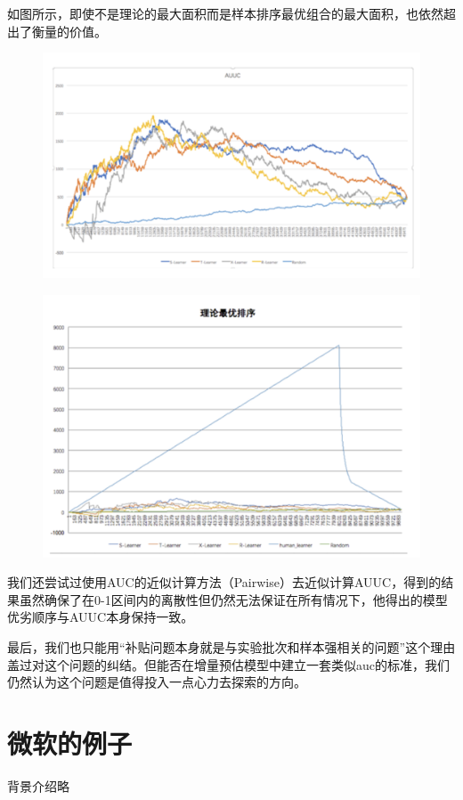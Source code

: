 \documentclass[12pt]{article}
\begin{document}
如图所示，即使不是理论的最大面积而是样本排序最优组合的最大面积，也依然超出了衡量的价值。
\begin{figure}[H]
    \centering
    \includegraphics[width=.8\textwidth]{fig/Casual_Inference_In_Didi_23.png}
\end{figure}
\begin{figure}[H]
    \centering
    \includegraphics[width=.8\textwidth]{fig/Casual_Inference_In_Didi_24.png}
\end{figure}
我们还尝试过使用AUC的近似计算方法（Pairwise）去近似计算AUUC，得到的结果虽然确保了在0-1区间内的离散性但仍然无法保证在所有情况下，他得出的模型优劣顺序与AUUC本身保持一致。

最后，我们也只能用“补贴问题本身就是与实验批次和样本强相关的问题”这个理由盖过对这个问题的纠结。但能否在增量预估模型中建立一套类似auc的标准，我们仍然认为这个问题是值得投入一点心力去探索的方向。 

\section{微软的例子\cite{Customer_Segmentation_Example_From_Microsoft}}
背景介绍略
\end{document}

